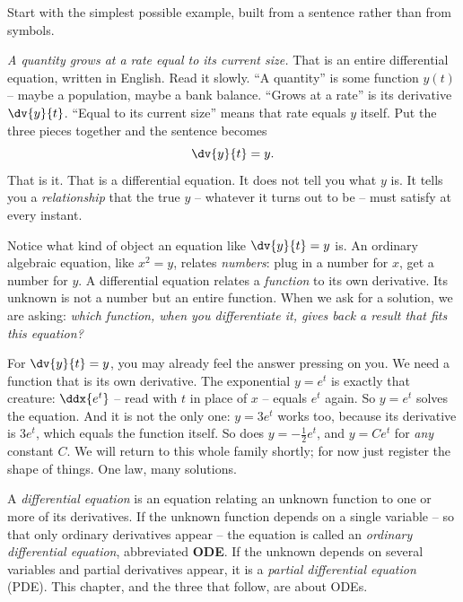 Start with the simplest possible example, built from a sentence rather than from symbols.

\begin{intuitionbox}
\emph{A quantity grows at a rate equal to its current size.} That is an entire differential equation, written in English. Read it slowly. ``A quantity'' is some function $y(t)$ -- maybe a population, maybe a bank balance. ``Grows at a rate'' is its derivative $\dv{y}{t}$. ``Equal to its current size'' means that rate equals $y$ itself. Put the three pieces together and the sentence becomes
\[
  \dv{y}{t} = y.
\]
That is it. That is a differential equation. It does not tell you what $y$ is. It tells you a \emph{relationship} that the true $y$ -- whatever it turns out to be -- must satisfy at every instant.
\end{intuitionbox}

Notice what kind of object an equation like $\dv{y}{t} = y$ is. An ordinary algebraic equation, like $x^2 = y$, relates \emph{numbers}: plug in a number for $x$, get a number for $y$. A differential equation relates a \emph{function} to its own derivative. Its unknown is not a number but an entire function. When we ask for a solution, we are asking: \emph{which function, when you differentiate it, gives back a result that fits this equation?}

For $\dv{y}{t} = y$, you may already feel the answer pressing on you. We need a function that is its own derivative. The exponential $y = e^t$ is exactly that creature: $\ddx{e^t}$ -- read with $t$ in place of $x$ -- equals $e^t$ again. So $y = e^t$ solves the equation. And it is not the only one: $y = 3e^t$ works too, because its derivative is $3e^t$, which equals the function itself. So does $y = -\tfrac{1}{2}e^t$, and $y = Ce^t$ for \emph{any} constant $C$. We will return to this whole family shortly; for now just register the shape of things. One law, many solutions.

\begin{definition}
\label{ch36:def-de}
A \emph{differential equation} is an equation relating an unknown function to one or more of its derivatives. If the unknown function depends on a single variable -- so that only ordinary derivatives appear -- the equation is called an \emph{ordinary differential equation}, abbreviated \textbf{ODE}. If the unknown depends on several variables and partial derivatives appear, it is a \emph{partial differential equation} (PDE). This chapter, and the three that follow, are about ODEs.
\end{definition}

